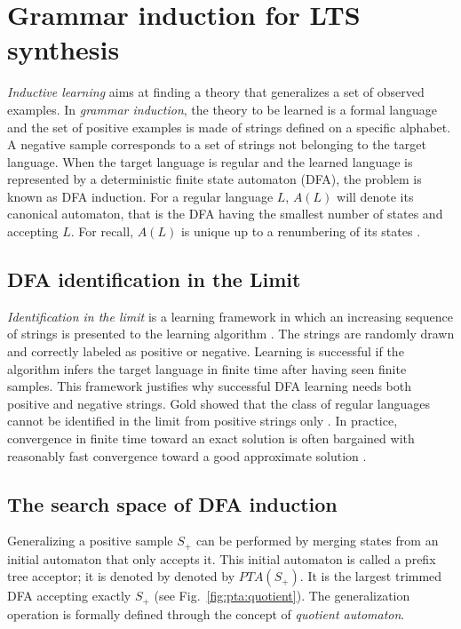 \section{Grammar induction for LTS synthesis\label{section:inductive-background}}

\emph{Inductive learning} aims at finding a theory that generalizes a set of observed examples. In \emph{grammar induction}, the theory to be learned is a formal language and the set of positive examples is made of strings defined on a specific alphabet. A negative sample corresponds to a set of strings not belonging to the target language. When the target language is regular and the learned language is represented by a deterministic finite state automaton (DFA), the problem is known as DFA induction. For a regular language $L$, $A(L)$ will denote its canonical automaton, that is the DFA having the smallest number of states and accepting $L$. For recall, $A(L)$ is unique up to a renumbering of its states \cite{Hopcroft:1979}.

\subsection{DFA identification in the Limit\label{subsection:dfa-identification-in-the-limit}}

\emph{Identification in the limit} is a learning framework in which an increasing sequence of strings is presented to the learning algorithm \cite{Gold:1967}. The strings are randomly drawn and correctly labeled as positive or negative. Learning is successful if the algorithm infers the target language in finite time after having seen finite samples. This framework justifies why successful DFA learning needs both positive and negative strings. Gold showed that the class of regular languages cannot be identified in the limit from positive strings only \cite{Gold:1967}. In practice, convergence in finite time toward an exact solution is often bargained with reasonably fast convergence toward a good approximate solution \cite{Lang:1992}.

\subsection{The search space of DFA induction\label{subsection:gi-background-search-space}}

Generalizing a positive sample $S_+$ can be performed by merging states from an initial automaton that only accepts it.  This initial automaton is called a prefix tree acceptor; it is denoted by denoted by $PTA(S_+)$. It is the largest trimmed DFA accepting exactly $S_+$ (see Fig.~\ref{fig:pta:quotient}). The generalization operation is formally defined through the concept of \emph{quotient automaton}.

